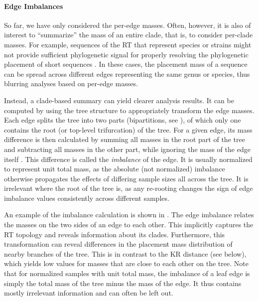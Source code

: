 \paragraph{Edge Imbalances}
\label{ch:Foundations:sec:PhylogeneticPlacement:sub:PlacementProcessing:par:EdgeImbalances}

So far, we have only considered the per-edge masses.
Often, however, it is also of interest to ``summarize'' the mass of an entire clade, that is, to consider per-clade masses.
For example, sequences of the \ac{RT} that represent species or strains might not provide sufficient phylogenetic signal
for properly resolving the phylogenetic placement of short sequences \cite{Dunthorn2014}.
In these cases, the placement mass of a sequence can be spread across different edges representing the same genus or species,
thus blurring analyses based on per-edge masses.

Instead, a clade-based summary can yield clearer analysis results.
It can be computed by using the tree structure to appropriately transform the edge masses.
Each edge splits the tree into two parts
(bipartitions, see ),
of which only one contains the root (or top-level trifurcation) of the tree.
For a given edge, its mass difference is then calculated by summing all masses in the root part of the tree
and subtracting all masses in the other part,
while ignoring the mass of the edge itself \cite{Matsen2011a}.
This difference is called the \emph{imbalance} of the edge.
It is usually normalized to represent unit total mass,
as the absolute (not normalized) imbalance otherwise propagates the effects of differing sample sizes all across the tree.
It is irrelevant where the root of the tree is,
as any re-rooting changes the sign of edge imbalance values consistently across different samples.

An example of the imbalance calculation is shown in .
The edge imbalance relates the masses on the two sides of an edge to each other.
This implicitly captures the \ac{RT} topology and reveals information about its clades.
Furthermore, this transformation can reveal differences in the placement mass distribution
of nearby branches of the tree.
This is in contrast to the KR distance (see  below),
which yields low values for masses that are close to each other on the tree.
Note that for normalized samples with unit total mass,
the imbalance of a leaf edge is simply the total mass of the tree minus the mass of the edge.
It thus contains mostly irrelevant information and can often be left out.

